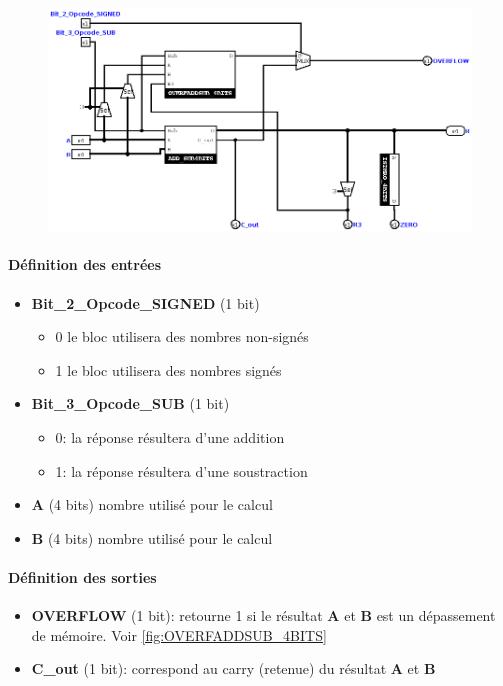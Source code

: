 \documentclass[a4paper]{article}
\begin{document}
\begin{tcolorbox}[colframe=Monokaimagenta,colback=white]

\begin{figure}[H]
    \centering
    \includegraphics[width=\textwidth]{src/ADDSUB_ALU.png}
\end{figure}

\paragraph{Définition des entrées}
\begin{itemize}
\item \textbf{Bit\_2\_Opcode\_SIGNED} (1 bit)
     \begin{itemize}
            \item 0 le bloc utilisera des nombres non-signés
            \item 1 le bloc utilisera des nombres signés
        \end{itemize}
\item \textbf{Bit\_3\_Opcode\_SUB} (1 bit) 
    \begin{itemize}
            \item 0: la réponse résultera d'une addition
            \item 1: la réponse résultera d'une soustraction
        \end{itemize}
\item \textbf{A} (4 bits) nombre utilisé pour le calcul 
\item \textbf{B} (4 bits) nombre utilisé pour le calcul 
\end{itemize}

\paragraph{Définition des sorties}
\begin{itemize}
    \item \textbf{OVERFLOW} (1 bit): retourne 1 si le résultat \textbf{A} et \textbf{B} est un dépassement de mémoire. Voir \ref{fig:OVERFADDSUB_4BITS}
    \item \textbf{C\_out} (1 bit): correspond au carry (retenue) du résultat \textbf{A} et \textbf{B}
    

\end{itemize}
\end{tcolorbox}
\end{document}
